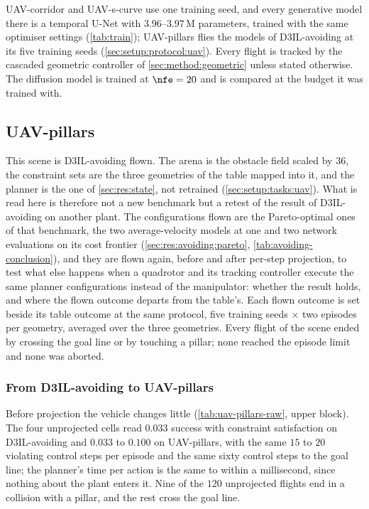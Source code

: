 UAV-corridor and UAV-s-curve use one training seed, and every generative model there is a temporal U-Net
with $3.96$--$3.97$\,M parameters, trained with the same optimiser settings (\autoref{tab:train});
UAV-pillars flies the models of D3IL-avoiding at its five training seeds (\autoref{sec:setup:protocol:uav}).
Every flight is tracked by the cascaded geometric controller of \autoref{sec:method:geometric} unless
stated otherwise. The diffusion
model is trained at $\nfe=20$ and is compared at the budget it was trained with.

\subsection{UAV-pillars}\label{sec:res:uav:pillars}

This scene is D3IL-avoiding flown. The arena is the obstacle field scaled by $36$, the constraint sets are
the three geometries of the table mapped into it, and the planner is the one of \autoref{sec:res:state},
not retrained (\autoref{sec:setup:tasks:uav}). What is read here is therefore not a new benchmark but a
retest of the result of D3IL-avoiding on another plant. The configurations flown are the Pareto-optimal ones
of that benchmark, the two average-velocity models at one and two network evaluations on its cost frontier
(\autoref{sec:res:avoiding:pareto}, \autoref{tab:avoiding-conclusion}), and they are flown again, before and
after per-step projection, to test what else happens when a quadrotor and its tracking controller execute the
same planner configurations instead of the manipulator: whether the result holds, and where the flown outcome departs from the
table's. Each flown outcome is set beside its table outcome at the same protocol, five training seeds $\times$
two episodes per geometry, averaged over the three geometries. Every flight of the scene ended by crossing the goal line
or by touching a pillar; none reached the episode limit and none was aborted.

\subsubsection{From D3IL-avoiding to UAV-pillars}\label{sec:res:uav:models}

Before projection the vehicle changes little (\autoref{tab:uav-pillars-raw}, upper block). The four
unprojected cells read $0.033$ success with constraint satisfaction on D3IL-avoiding and $0.033$ to
$0.100$ on UAV-pillars, with the same $15$ to $20$ violating control steps per episode and the same sixty
control steps to the goal line; the planner's time per action is the same to within a millisecond, since
nothing about the plant enters it. Nine of the $120$ unprojected flights end in a collision with a pillar,
and the rest cross the goal line.

